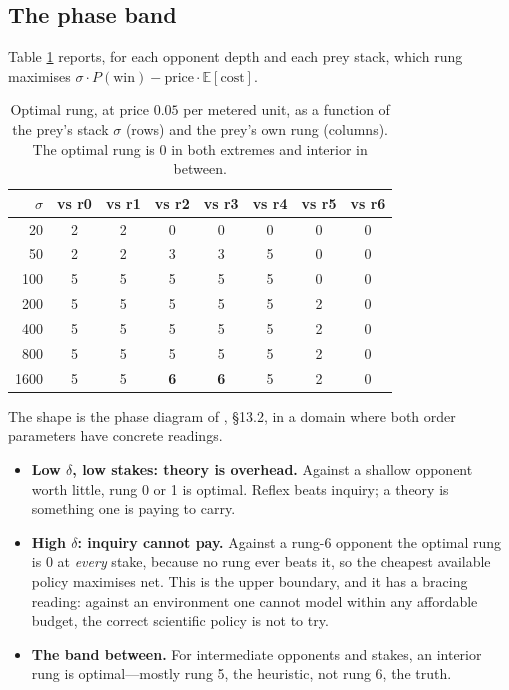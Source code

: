 \documentclass[11pt]{article}
\theoremstyle{definition}
\theoremstyle{plain}
\theoremstyle{remark}
\begin{document}
\subsection{The phase band}

Table \ref{tab:phase} reports, for each opponent depth and each prey stack, which
rung maximises $\sigma\cdot P(\text{win}) - \text{price}\cdot \mathbb{E}[\text{cost}]$.

\begin{table}[h]
\centering
\begin{tabular}{@{}rccccccc@{}}
\toprule
$\sigma$ & vs r0 & vs r1 & vs r2 & vs r3 & vs r4 & vs r5 & vs r6 \\
\midrule
20   & 2 & 2 & 0 & 0 & 0 & 0 & 0 \\
50   & 2 & 2 & 3 & 3 & 5 & 0 & 0 \\
100  & 5 & 5 & 5 & 5 & 5 & 0 & 0 \\
200  & 5 & 5 & 5 & 5 & 5 & 2 & 0 \\
400  & 5 & 5 & 5 & 5 & 5 & 2 & 0 \\
800  & 5 & 5 & 5 & 5 & 5 & 2 & 0 \\
1600 & 5 & 5 & \textbf{6} & \textbf{6} & 5 & 2 & 0 \\
\bottomrule
\end{tabular}
\caption{Optimal rung, at price $0.05$ per metered unit, as a function of the
prey's stack $\sigma$ (rows) and the prey's own rung (columns). The optimal rung
is $0$ in both extremes and interior in between.}
\label{tab:phase}
\end{table}

The shape is the phase diagram of \cite{scientist}, \S13.2, in a domain where
both order parameters have concrete readings.

\begin{itemize}
\item \textbf{Low $\delta$, low stakes: theory is overhead.} Against a shallow
opponent worth little, rung 0 or 1 is optimal. Reflex beats inquiry; a theory is
something one is paying to carry.
\item \textbf{High $\delta$: inquiry cannot pay.} Against a rung-6 opponent the
optimal rung is $0$ at \emph{every} stake, because no rung ever beats it, so the
cheapest available policy maximises net. This is the upper boundary, and it has
a bracing reading: against an environment one cannot model within any affordable
budget, the correct scientific policy is not to try.
\item \textbf{The band between.} For intermediate opponents and stakes, an
interior rung is optimal---mostly rung 5, the heuristic, not rung 6, the truth.
\end{itemize}
\end{document}
